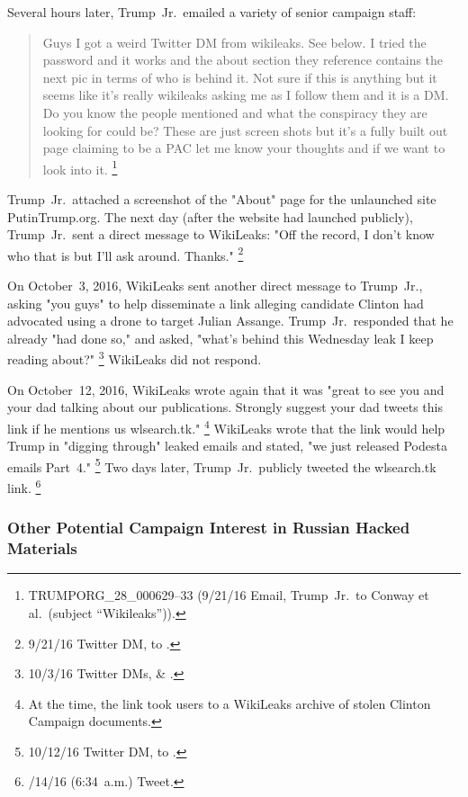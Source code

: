 Several hours later, Trump~Jr.\ emailed a variety of senior campaign staff:

\begin{quote}
Guys I got a weird Twitter DM from wikileaks.
See below.
I tried the password and it works and the about section they reference contains the next pic in terms of who is behind it.
Not sure if this is anything but it seems like it's really wikileaks asking me as I follow them and it is a DM\null.
Do you know the people mentioned and what the conspiracy they are looking for could be?
These are just screen shots but it's a fully built out page claiming to be a PAC let me know your thoughts and if we want to look into it.%
\footnote{TRUMPORG\_28\_000629--33 (9/21/16 Email, Trump~Jr.\ to Conway et al.\ (subject ``Wikileaks'')).}
\end{quote}

Trump~Jr.\ attached a screenshot of the "About" page for the unlaunched site PutinTrump.org.
The next day (after the website had launched publicly), Trump~Jr.\ sent a direct message to WikiLeaks:
"Off the record, I don't know who that is but I'll ask around. Thanks."%
\footnote{9/21/16 Twitter DM, \@DonaldJTrumpJr to \@WikiLeaks.}

On October~3, 2016, WikiLeaks sent another direct message to Trump~Jr., asking "you guys" to help disseminate a link alleging candidate Clinton had advocated using a drone to target Julian Assange.
Trump~Jr.\ responded that he already "had done so," and asked, "what's behind this Wednesday leak I keep reading about?"%
\footnote{10/3/16 Twitter DMs, \@DonaldJTrumpJr \& \@WikiLeaks.}
WikiLeaks did not respond.

On October~12, 2016, WikiLeaks wrote again that it was "great to see you and your dad talking about our publications.
Strongly suggest your dad tweets this link if he mentions us wlsearch.tk."%
\footnote{At the time, the link took users to a WikiLeaks archive of stolen Clinton Campaign documents.}
WikiLeaks wrote that the link would help Trump in "digging through" leaked emails and stated, "we just released Podesta emails Part~4."%
\footnote{10/12/16 Twitter DM, \@WikiLeaks to \@DonaldJTrumpJr.}
Two days later, Trump~Jr.\ publicly tweeted the wlsearch.tk link.%
\footnote{/14/16 (6:34~a.m.) Tweet.}

\subsubsection{Other Potential Campaign Interest in Russian Hacked Materials}

